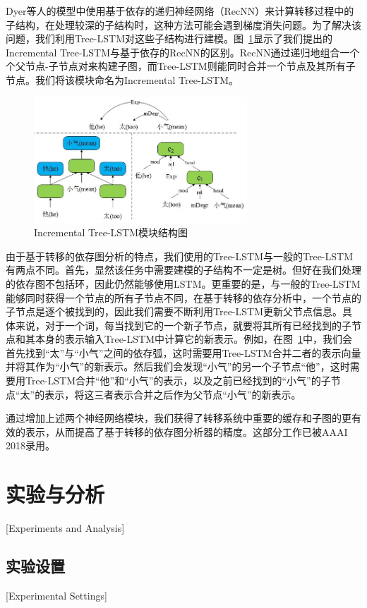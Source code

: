 Dyer等人的模型中使用基于依存的递归神经网络（RecNN）\cite{socher2011parsing}来计算转移过程中的子结构，在处理较深的子结构时，这种方法可能会遇到梯度消失问题。为了解决该问题，我们利用Tree-LSTM\cite{tai-socher-manning:2015:ACL-IJCNLP}对这些子结构进行建模。图~\ref{fig:it}显示了我们提出的Incremental Tree-LSTM与基于依存的RecNN的区别。RecNN通过递归地组合一个个父节点-子节点对来构建子图，而Tree-LSTM则能同时合并一个节点及其所有子节点。我们将该模块命名为Incremental Tree-LSTM。

\begin{figure}[hbtp]
	\centering
	\includegraphics[width=80mm]{figures/it.jpg}
	\caption{Incremental Tree-LSTM模块结构图}
	\label{fig:it}
\end{figure}

由于基于转移的依存图分析的特点，我们使用的Tree-LSTM与一般的Tree-LSTM有两点不同。首先，显然该任务中需要建模的子结构不一定是树。但好在我们处理的依存图不包括环，因此仍然能够使用LSTM。更重要的是，与一般的Tree-LSTM能够同时获得一个节点的所有子节点不同，在基于转移的依存分析中，一个节点的子节点是逐个被找到的，因此我们需要不断利用Tree-LSTM更新父节点信息。具体来说，对于一个词，每当找到它的一个新子节点，就要将其所有已经找到的子节点和其本身的表示输入Tree-LSTM中计算它的新表示。例如，在图~\ref{fig:it}中，我们会首先找到“太”与“小气”之间的依存弧，这时需要用Tree-LSTM合并二者的表示向量并将其作为“小气”的新表示。然后我们会发现“小气”的另一个子节点“他”，这时需要用Tree-LSTM合并“他”和“小气”的表示，以及之前已经找到的“小气”的子节点“太”的表示，将这三者表示合并之后作为父节点“小气”的新表示。

通过增加上述两个神经网络模块，我们获得了转移系统中重要的缓存和子图的更有效的表示，从而提高了基于转移的依存图分析器的精度。这部分工作已被AAAI 2018录用。


\section{实验与分析}[Experiments and Analysis]

\subsection{实验设置}[Experimental Settings]


